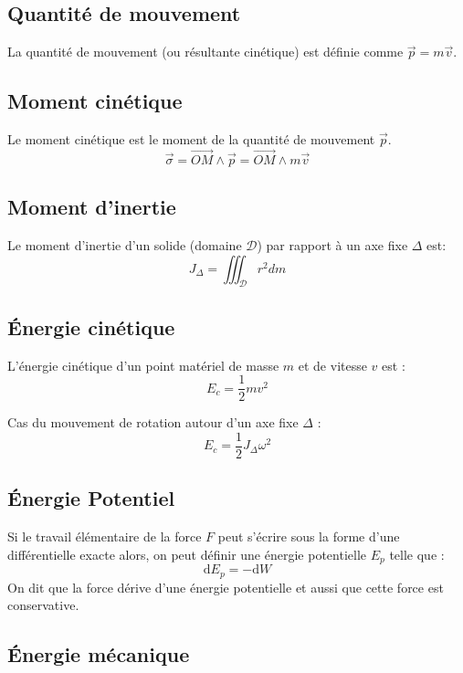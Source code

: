 \documentclass[a4paper,12pt]{article}
\newcommand{\diff}{\mathrm{d}} %
\renewcommand{\vec}{\overrightarrow}  %
\begin{document}
        \subsection{Quantité de mouvement}
            La quantité de mouvement (ou résultante cinétique) est définie comme $\vec{p} = m \vec{v}$.

        \subsection{Moment cinétique}
            Le moment cinétique est le moment de la quantité de mouvement $\vec{p}$.
            $$ \vec \sigma = \vec{OM} \wedge \vec p = \vec{OM} \wedge m \vec v $$
        
        \subsection{Moment d'inertie}
            Le moment d'inertie d'un solide (domaine $\mathcal{D}$) par rapport à un axe fixe $\Delta$ est:
                $$ J_\Delta = \iiint_{\mathcal{D}} r^2 dm $$



        \subsection{Énergie cinétique}
            L'énergie cinétique d'un point matériel de masse $m$ et de vitesse $v$ est : 
                $$ E_c = \frac{1}{2} m v^2 $$

            Cas du mouvement de rotation autour d'un axe fixe $\Delta$ :
                $$ E_c = \frac{1}{2} J_\Delta \omega^2 $$

        \subsection{Énergie Potentiel}

            Si le travail élémentaire de la force $F$ peut s'écrire sous la
            forme d'une différentielle exacte alors, on peut définir
            une énergie potentielle $E_p$ telle que :
            $$ \diff E_p = -\diff W $$
            On dit que la force dérive d'une énergie potentielle et 
            aussi que cette force est conservative.

        \subsection{Énergie mécanique}
\end{document}
